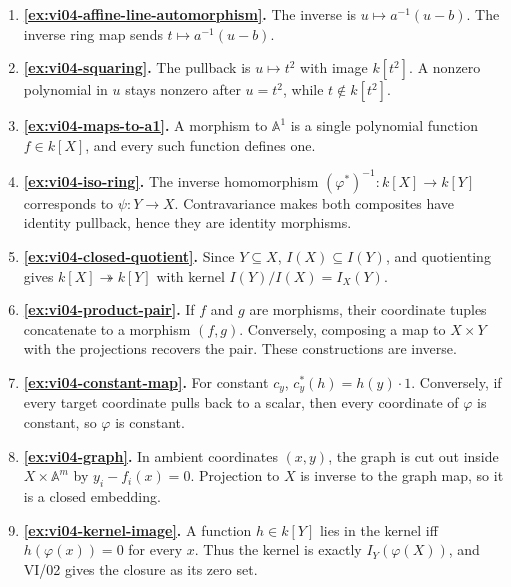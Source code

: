 \begin{enumerate}[label=\textbf{E\arabic*.},leftmargin=*,itemsep=1em]
\item \textbf{\cref{ex:vi04-affine-line-automorphism}.}  The inverse is
\(u\mapsto a^{-1}(u-b)\).  The inverse ring map sends \(t\mapsto a^{-1}(u-b)\).

\item \textbf{\cref{ex:vi04-squaring}.}  The pullback is \(u\mapsto t^2\) with image
\(k[t^2]\).  A nonzero polynomial in \(u\) stays nonzero after \(u=t^2\), while
\(t\notin k[t^2]\).

\item \textbf{\cref{ex:vi04-maps-to-a1}.}  A morphism to \(\mathbb A^1\) is a single
polynomial function \(f\in k[X]\), and every such function defines one.

\item \textbf{\cref{ex:vi04-iso-ring}.}  The inverse homomorphism
\((\varphi^*)^{-1}:k[X]\to k[Y]\) corresponds to \(\psi:Y\to X\).  Contravariance makes
both composites have identity pullback, hence they are identity morphisms.

\item \textbf{\cref{ex:vi04-closed-quotient}.}  Since \(Y\subseteq X\),
\(I(X)\subseteq I(Y)\), and quotienting gives
\(k[X]\twoheadrightarrow k[Y]\) with kernel \(I(Y)/I(X)=I_X(Y)\).

\item \textbf{\cref{ex:vi04-product-pair}.}  If \(f\) and \(g\) are morphisms, their
coordinate tuples concatenate to a morphism \((f,g)\).  Conversely, composing a map to
\(X\times Y\) with the projections recovers the pair.  These constructions are inverse.

\item \textbf{\cref{ex:vi04-constant-map}.}  For constant \(c_y\),
\(c_y^*(h)=h(y)\cdot1\).  Conversely, if every target coordinate pulls back to a scalar,
then every coordinate of \(\varphi\) is constant, so \(\varphi\) is constant.

\item \textbf{\cref{ex:vi04-graph}.}  In ambient coordinates \((x,y)\), the graph is
cut out inside \(X\times\mathbb A^m\) by \(y_i-f_i(x)=0\).  Projection to \(X\) is inverse
to the graph map, so it is a closed embedding.

\item \textbf{\cref{ex:vi04-kernel-image}.}  A function \(h\in k[Y]\) lies in the kernel
iff \(h(\varphi(x))=0\) for every \(x\).  Thus the kernel is exactly
\(I_Y(\varphi(X))\), and VI/02 gives the closure as its zero set.
\end{enumerate}
